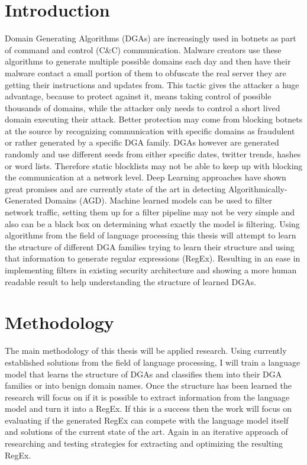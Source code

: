 \documentclass[a4paper, 12pt]{article}
\begin{document}
\section{Introduction}
Domain Generating Algorithms (DGAs) are increasingly used in botnets as part of
command and control (C\&C) communication. Malware creators use these algorithms
to generate multiple possible domains each day and then have their malware
contact a small portion of them to obfuscate the real server they are getting
their instructions and updates from. This tactic gives the attacker a huge
advantage, because to protect against it, means taking control of possible thousands
of domains, while the attacker only needs to control a short lived domain
executing their attack. Better protection may come from blocking
botnets at the source by recognizing communication with specific domains as
fraudulent or rather generated by a specific DGA family. DGAs however are
generated randomly and use different seeds from either specific dates, twitter
trends, hashes or word lists. Therefore static blocklists may not be able to
keep up with blocking the communication at a network level. Deep Learning
approaches have shown great promises and are currently state of the art in
detecting Algorithmically-Generated Domains (AGD). 
Machine learned models can be used to filter network traffic, setting them up for a filter pipeline
may not be very simple and also can be a black box on determining what exactly the model is
filtering.
Using algorithms from the field of language processing this thesis will attempt to learn the
structure of different DGA families trying to learn their structure and using that information to
generate regular expressions (RegEx). Resulting in an ease in implementing filters in existing
security architecture and showing a more human readable result to help understanding the structure
of learned DGAs.

\section{Methodology}
The main methodology of this thesis will be applied research. Using currently established solutions
from the field of language processing, I will train a language model that learns the structure of
DGAs and classifies them into their DGA families or into benign domain names. Once the structure has
been learned the research will focus on if it is possible to extract information from the language
model and turn it into a RegEx. If this is a success then the work will focus on evaluating if the
generated RegEx can compete with the language model itself and solutions of the current state of the
art. Again in an iterative approach of researching and testing strategies for extracting and
optimizing the resulting RegEx.
\end{document}
